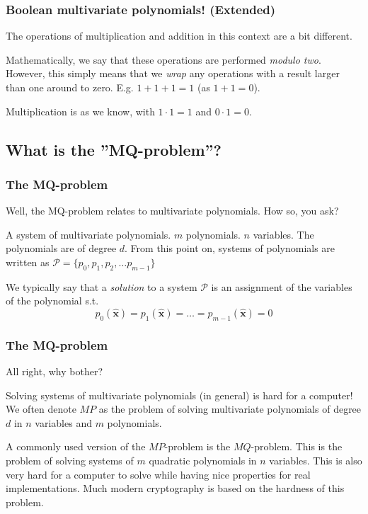 \documentclass{beamer}
\begin{document}
\begin{frame}
    \frametitle{Boolean multivariate polynomials! (Extended)}
    The operations of multiplication and addition in this context are a bit different.

    \pause 

    Mathematically, we say that these operations are performed \textit{modulo two}. However, this simply means that we \textit{wrap} any operations with a result larger than one around to zero. E.g. $1 + 1 + 1 = 1$ (as $1 + 1 = 0$).

    Multiplication is as we know, with $1 \cdot 1 = 1$ and $0 \cdot 1 = 0$.
\end{frame}

\subsection{What is the ''MQ-problem''?}
\begin{frame}
    \frametitle{The MQ-problem}
    Well, the MQ-problem relates to multivariate polynomials. How so, you ask?
    \pause
    \begin{outline}
        \1 A system of multivariate polynomials.
            \2 $m$ polynomials. 
            \2 $n$ variables.
            \2 The polynomials are of degree $d$.
            \2 From this point on, systems of polynomials are written as $\mathcal{P} = \{p_0, p_1, p_2, \dots p_{m-1}\}$
    \end{outline}

    \pause 

    We typically say that a \textit{solution} to a system $\mathcal{P}$ is an assignment of the variables of the polynomial s.t. 
    $$
        p_{0}(\hat{\mathbf{x}}) = p_{1}(\hat{\mathbf{x}}) = \dots = p_{m-1}(\hat{\mathbf{x}}) = 0
    $$
\end{frame}

\begin{frame}
    \frametitle{The MQ-problem}
    All right, why bother?
    \pause
    \begin{outline}
        \1 Solving systems of multivariate polynomials (in general) is hard for a computer!
            \2 We often denote $MP$ as the problem of solving multivariate polynomials of degree $d$ in $n$ variables and $m$ polynomials.

        \pause 

        \1 A commonly used version of the $MP$-problem is the $MQ$-problem.
            \2 This is the problem of solving systems of $m$ quadratic polynomials in $n$ variables.
            \2 This is also very hard for a computer to solve while having nice properties for real implementations.
            \2 Much modern cryptography is based on the hardness of this problem.
    \end{outline}
\end{frame}
\end{document}
